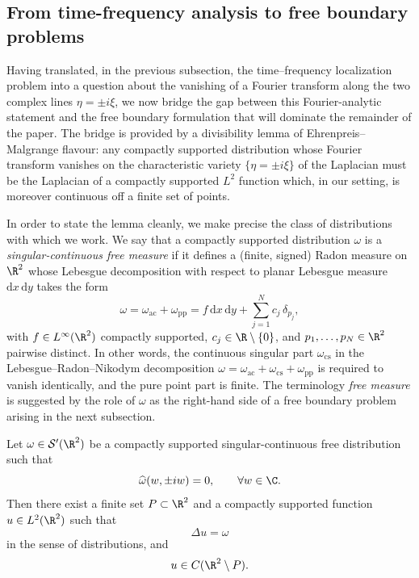 \subsection{From time-frequency analysis to free boundary problems}

Having translated, in the previous subsection, the time--frequency
localization problem into a question about the vanishing of a Fourier
transform along the two complex lines $\eta=\pm i\xi$, we now bridge the gap
between this Fourier-analytic statement and the free boundary formulation
that will dominate the remainder of the paper. The bridge is provided by a
divisibility lemma of Ehrenpreis--Malgrange flavour: any compactly supported
distribution whose Fourier transform vanishes on the characteristic variety
$\{\eta=\pm i\xi\}$ of the Laplacian must be the Laplacian of a compactly
supported $L^2$ function which, in our setting, is moreover continuous off a
finite set of points.

In order to state the lemma cleanly, we make precise the class of
distributions with which we work. We say that a compactly supported
distribution $\omega$ is a \emph{singular-continuous free measure} if it
defines a (finite, signed) Radon measure on $\R^2$ whose Lebesgue
decomposition with respect to planar Lebesgue measure $\mathrm{d}x\,
\mathrm{d}y$ takes the form
\[
\omega = \omega_{\mathrm{ac}} + \omega_{\mathrm{pp}}
       = f\,\mathrm{d}x\,\mathrm{d}y + \sum_{j=1}^N c_j\,\delta_{p_j},
\]
with \(f\in L^\infty(\R^2)\) compactly supported, \(c_j\in \R\setminus\{0\}\), and
$p_1,\ldots,p_N\in \R^2$ pairwise distinct. In other words, the continuous
singular part $\omega_{\mathrm{cs}}$ in the Lebesgue--Radon--Nikodym
decomposition $\omega=\omega_{\mathrm{ac}}+\omega_{\mathrm{cs}}+
\omega_{\mathrm{pp}}$ is required to vanish identically, and the pure
point part is finite. The terminology \emph{free measure} is suggested by
the role of $\omega$ as the right-hand side of a free boundary problem
arising in the next subsection.

\begin{lemma}\label{lemma:fourier-to-fboundary}
Let $\omega\in \mathcal{S}'(\R^2)$ be a compactly supported singular-continuous
free distribution such that
\[
\widehat{\omega}(w,\pm iw)=0,\qquad \forall w\in\C.
\]
Then there exist a finite set $P\subset \R^2$ and a compactly supported
function $u\in L^2(\R^2)$ such that
\[
\Delta u=\omega
\]
in the sense of distributions, and
\[
u\in C(\R^2\setminus P).
\]
\end{lemma}

